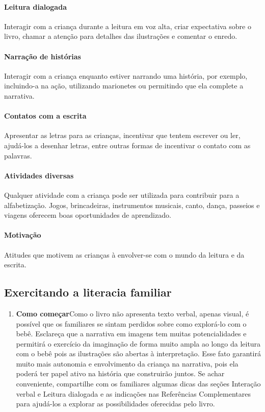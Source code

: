 \documentclass[11pt]{extarticle}
\begin{document}
\begin{enumerate}
\paragraph{Leitura dialogada} Interagir com a criança durante a leitura 
em voz alta, criar expectativa sobre o livro, chamar a atenção para detalhes 
das ilustrações e comentar o enredo.

\paragraph{Narração de histórias} Interagir com a criança enquanto 
estiver narrando uma história, por exemplo, incluindo-a na ação, utilizando 
marionetes ou permitindo que ela complete a narrativa.

\paragraph{Contatos com a escrita} Apresentar as letras para as 
crianças, incentivar que tentem escrever ou ler, ajudá-los a desenhar letras, 
entre outras formas de incentivar o contato com as palavras.

\paragraph{Atividades diversas} Qualquer atividade com a criança 
pode ser utilizada para contribuir para a alfabetização. Jogos, brincadeiras, 
instrumentos musicais, canto, dança, passeios e viagens oferecem boas 
oportunidades de aprendizado.

\paragraph{Motivação} Atitudes que motivem as crianças à envolver-se com 
o mundo da leitura e da escrita.

\subsection{Exercitando a literacia familiar}


\begin{enumerate}
\item \textbf{Como começar}\quad Como o livro não apresenta 
texto verbal, apenas visual, é possível que os familiares se sintam 
perdidos sobre como explorá-lo com o bebê. Esclareça que a narrativa 
em imagens tem muitas potencialidades e permitirá o exercício da imaginação 
de forma muito ampla ao longo da leitura com o bebê pois as ilustrações são 
abertas à interpretação. Esse fato garantirá muito mais autonomia e 
envolvimento da criança na narrativa, pois ela poderá ter papel ativo na 
história que construirão juntos. Se achar conveniente, compartilhe com 
os familiares algumas dicas das seções Interação verbal 
e Leitura dialogada e as indicações nas Referências Complementares 
para ajudá-los a explorar as possibilidades oferecidas pelo livro. 


\end{enumerate}
\end{enumerate}
\end{document}
